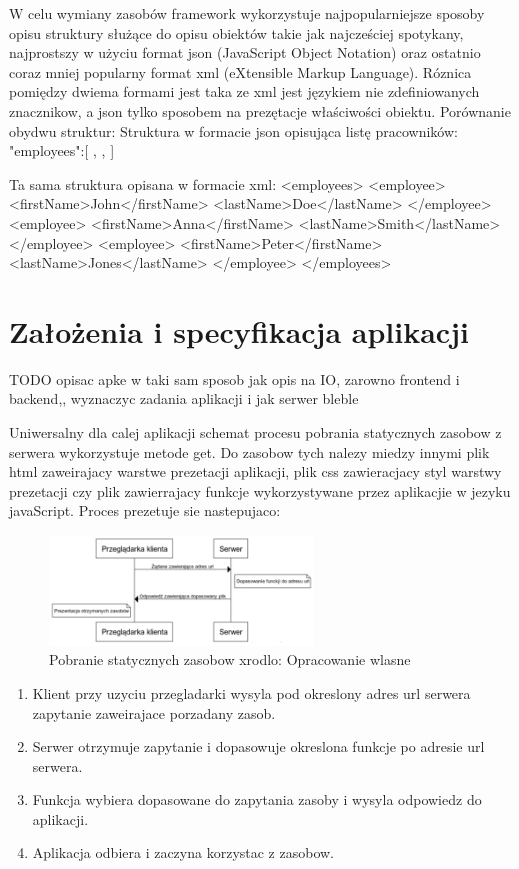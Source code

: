 \documentclass[12pt]{report}
\begin{document}
W celu wymiany zasobów framework wykorzystuje najpopularniejsze sposoby opisu struktury służące do opisu obiektów takie jak najcześciej spotykany, najprostszy w użyciu format json (JavaScript Object Notation) oraz ostatnio coraz mniej popularny format xml (eXtensible Markup Language). 
Róznica pomiędzy dwiema formami jest taka ze xml jest językiem nie zdefiniowanych znacznikow, a json tylko sposobem na prezętacje właściwości obiektu. 
Porównanie obydwu struktur:
Struktura w formacie json opisująca listę pracowników:
{"employees":[
,
,
]}

Ta sama struktura opisana w formacie xml:
<employees>
\tab<employee>
\tab\tab<firstName>John</firstName> <lastName>Doe</lastName>
\tab</employee>
\tab<employee>
\tab\tab<firstName>Anna</firstName> <lastName>Smith</lastName>
\tab</employee>
\tab<employee>
\tab\tab<firstName>Peter</firstName> <lastName>Jones</lastName>
\tab</employee>
</employees>


\chapter{Założenia i specyfikacja aplikacji} \label{rozdz.3} 
TODO opisac apke w taki sam sposob jak opis na IO, zarowno frontend i backend,, wyznaczyc zadania aplikacji i jak serwer bleble

Uniwersalny dla calej aplikacji schemat procesu pobrania statycznych zasobow z serwera wykorzystuje metode get. Do zasobow tych nalezy miedzy innymi plik html zaweirajacy warstwe prezetacji aplikacji, plik css zawieracjacy styl warstwy prezetacji czy plik zawierrajacy funkcje wykorzystywane przez aplikacjie w jezyku javaScript. Proces prezetuje sie nastepujaco:
\begin{figure}[!t]
\centering
\includegraphics[width=7cm]{K-S.png} 
\caption{Pobranie statycznych zasobow xrodlo: Opracowanie wlasne}
\end{figure}
\begin{enumerate}
\item Klient przy uzyciu przegladarki wysyla pod okreslony adres url serwera zapytanie zaweirajace porzadany zasob.
\item Serwer otrzymuje zapytanie i dopasowuje okreslona funkcje po adresie url serwera.
\item Funkcja wybiera dopasowane do zapytania zasoby i wysyla odpowiedz do aplikacji.
\item Aplikacja odbiera i zaczyna korzystac z zasobow.
\end{enumerate}
\end{document}
